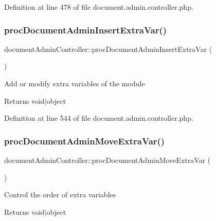 Definition at line 478 of file document.\+admin.\+controller.\+php.

\mbox{\label{classdocumentAdminController_a8f766283de71f7b22d325eb8dd8b4053}} 
\subsubsection{\texorpdfstring{proc\+Document\+Admin\+Insert\+Extra\+Var()}{procDocumentAdminInsertExtraVar()}}
{\footnotesize\ttfamily document\+Admin\+Controller\+::proc\+Document\+Admin\+Insert\+Extra\+Var (\begin{DoxyParamCaption}{ }\end{DoxyParamCaption})}

Add or modify extra variables of the module \begin{DoxyReturn}{Returns}
void$\vert$object 
\end{DoxyReturn}


Definition at line 544 of file document.\+admin.\+controller.\+php.

\mbox{\label{classdocumentAdminController_a037c8e048b5cd6199dd83abbfcb7b92e}} 
\subsubsection{\texorpdfstring{proc\+Document\+Admin\+Move\+Extra\+Var()}{procDocumentAdminMoveExtraVar()}}
{\footnotesize\ttfamily document\+Admin\+Controller\+::proc\+Document\+Admin\+Move\+Extra\+Var (\begin{DoxyParamCaption}{ }\end{DoxyParamCaption})}

Control the order of extra variables \begin{DoxyReturn}{Returns}
void$\vert$object 
\end{DoxyReturn}


